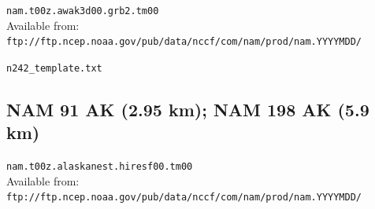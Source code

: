 \documentclass[11pt]{article}   %
\begin{document}
\verb|nam.t00z.awak3d00.grb2.tm00|\\
Available from:\\
\verb|ftp://ftp.ncep.noaa.gov/pub/data/nccf/com/nam/prod/nam.YYYYMDD/|

\verb|n242_template.txt| \\
\tiny  \normalsize

\clearpage
\subsection{NAM 91 AK (2.95 km); NAM 198 AK (5.9 km)}

\verb|nam.t00z.alaskanest.hiresf00.tm00|\\
Available from:\\
\verb|ftp://ftp.ncep.noaa.gov/pub/data/nccf/com/nam/prod/nam.YYYYMDD/| \\
\end{document}
